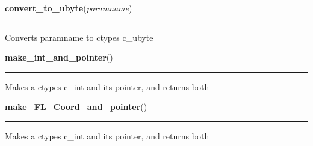     \label{xformslib:library:convert_to_ubyte}

    \vspace{0.5ex}

\hspace{.8\funcindent}\begin{boxedminipage}{\funcwidth}

    \raggedright \textbf{convert\_to\_ubyte}(\textit{paramname})

    \vspace{-1.5ex}

    \rule{\textwidth}{0.5\fboxrule}
\setlength{\parskip}{2ex}
    Converts paramname to ctypes c\_ubyte

\setlength{\parskip}{1ex}
    \end{boxedminipage}

    \label{xformslib:library:make_int_and_pointer}

    \vspace{0.5ex}

\hspace{.8\funcindent}\begin{boxedminipage}{\funcwidth}

    \raggedright \textbf{make\_int\_and\_pointer}()

    \vspace{-1.5ex}

    \rule{\textwidth}{0.5\fboxrule}
\setlength{\parskip}{2ex}
    Makes a ctypes c\_int and its pointer, and returns both

\setlength{\parskip}{1ex}
    \end{boxedminipage}

    \label{xformslib:library:make_int_and_pointer}

    \vspace{0.5ex}

\hspace{.8\funcindent}\begin{boxedminipage}{\funcwidth}

    \raggedright \textbf{make\_FL\_Coord\_and\_pointer}()

    \vspace{-1.5ex}

    \rule{\textwidth}{0.5\fboxrule}
\setlength{\parskip}{2ex}
    Makes a ctypes c\_int and its pointer, and returns both

\setlength{\parskip}{1ex}
    \end{boxedminipage}

